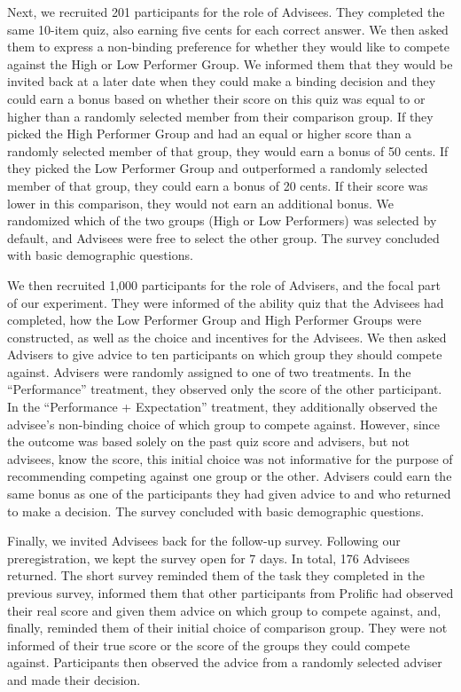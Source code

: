 \documentclass[
  man,
  floatsintext,
  longtable,
  nolmodern,
  notxfonts,
  notimes,
  colorlinks=true,linkcolor=blue,citecolor=blue,urlcolor=blue]{apa7}
\begin{document}
Next, we recruited 201 participants for the role of Advisees. They
completed the same 10-item quiz, also earning five cents for each
correct answer. We then asked them to express a non-binding preference
for whether they would like to compete against the High or Low Performer
Group. We informed them that they would be invited back at a later date
when they could make a binding decision and they could earn a bonus
based on whether their score on this quiz was equal to or higher than a
randomly selected member from their comparison group. If they picked the
High Performer Group and had an equal or higher score than a randomly
selected member of that group, they would earn a bonus of 50 cents. If
they picked the Low Performer Group and outperformed a randomly selected
member of that group, they could earn a bonus of 20 cents. If their
score was lower in this comparison, they would not earn an additional
bonus. We randomized which of the two groups (High or Low Performers)
was selected by default, and Advisees were free to select the other
group. The survey concluded with basic demographic questions.

We then recruited 1,000 participants for the role of Advisers, and the
focal part of our experiment. They were informed of the ability quiz
that the Advisees had completed, how the Low Performer Group and High
Performer Groups were constructed, as well as the choice and incentives
for the Advisees. We then asked Advisers to give advice to ten
participants on which group they should compete against. Advisers were
randomly assigned to one of two treatments. In the ``Performance''
treatment, they observed only the score of the other participant. In the
``Performance + Expectation'' treatment, they additionally observed the
advisee's non-binding choice of which group to compete against. However,
since the outcome was based solely on the past quiz score and advisers,
but not advisees, know the score, this initial choice was not
informative for the purpose of recommending competing against one group
or the other. Advisers could earn the same bonus as one of the
participants they had given advice to and who returned to make a
decision. The survey concluded with basic demographic questions.

Finally, we invited Advisees back for the follow-up survey. Following
our preregistration, we kept the survey open for 7 days. In total, 176
Advisees returned. The short survey reminded them of the task they
completed in the previous survey, informed them that other participants
from Prolific had observed their real score and given them advice on
which group to compete against, and, finally, reminded them of their
initial choice of comparison group. They were not informed of their true
score or the score of the groups they could compete against.
Participants then observed the advice from a randomly selected adviser
and made their decision.
\end{document}
